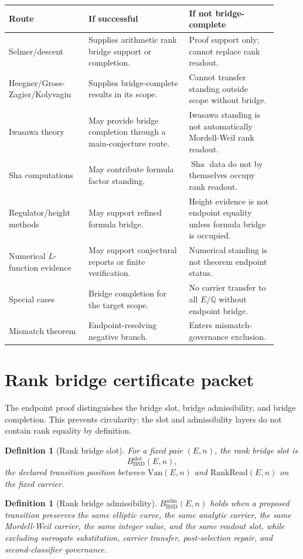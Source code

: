 \documentclass[11pt]{article}
\newtheorem{definition}[theorem]{Definition}
\newcommand{\Q}{\mathbb{Q}}
\newcommand{\Sha}{\operatorname{Sha}}
\newcommand{\BSD}{\mathrm{BSD}}
\newcommand{\Van}{\mathrm{Van}}
\newcommand{\RankRead}{\mathrm{RankRead}}
\newcommand{\slot}{\mathrm{slot}}
\newcommand{\adm}{\mathrm{adm}}
\begin{document}
\begin{longtable}{L{0.27\linewidth}L{0.34\linewidth}L{0.30\linewidth}}
\toprule
\textbf{Route} & \textbf{If successful} & \textbf{If not bridge-complete}\\
\midrule
Selmer/descent & Supplies arithmetic rank bridge support or completion. & Proof support only; cannot replace rank readout.\\
Heegner/Gross-Zagier/Kolyvagin & Supplies bridge-complete results in its scope. & Cannot transfer standing outside scope without bridge.\\
Iwasawa theory & May provide bridge completion through a main-conjecture route. & Iwasawa standing is not automatically Mordell-Weil rank readout.\\
Sha computations & May contribute formula factor standing. & $\Sha$ data do not by themselves occupy rank readout.\\
Regulator/height methods & May support refined formula bridge. & Height evidence is not endpoint equality unless formula bridge is occupied.\\
Numerical $L$-function evidence & May support conjectural reports or finite verification. & Numerical standing is not theorem endpoint status.\\
Special cases & Bridge completion for the target scope. & No carrier transfer to all $E/\Q$ without endpoint bridge.\\
Mismatch theorem & Endpoint-resolving negative branch. & Enters mismatch-governance exclusion.\\
\bottomrule
\end{longtable}


\section{Rank bridge certificate packet}

The endpoint proof distinguishes the bridge slot, bridge admissibility, and bridge completion. This prevents circularity: the slot and admissibility layers do not contain rank equality by definition.

\begin{definition}[Rank bridge slot]
For a fixed pair $(E,n)$, the rank bridge slot is
\[
B^{\slot}_{\BSD}(E,n),
\]
the declared transition position between $\Van(E,n)$ and $\RankRead(E,n)$ on the fixed carrier.
\end{definition}

\begin{definition}[Rank bridge admissibility]
$B^{\adm}_{\BSD}(E,n)$ holds when a proposed transition preserves the same elliptic curve, the same analytic carrier, the same Mordell-Weil carrier, the same integer value, and the same readout slot, while excluding surrogate substitution, carrier transfer, post-selection repair, and second-classifier governance.
\end{definition}
\end{document}
